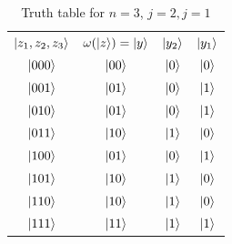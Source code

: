 \documentclass[12pt,a4paper]{article}
\begin{document}
\begin{table}[t]
    \centering
    \begin{tabular}{c|c|c|c}
        $\ket{z_1,z_2,z_3}$ & $\omega(\ket{z}) = \ket{y}$ & $\ket{y_2}$ & $\ket{y_1}$\\
        $\ket{000}$& $\ket{00}$ & $\ket{0}$ & $\ket{0}$\\
        $\ket{001}$& $\ket{01}$ & $\ket{0}$ & $\ket{1}$\\
        $\ket{010}$& $\ket{01}$ & $\ket{0}$ & $\ket{1}$\\
        $\ket{011}$& $\ket{10}$ & $\ket{1}$ & $\ket{0}$\\
        $\ket{100}$& $\ket{01}$ & $\ket{0}$ & $\ket{1}$\\
        $\ket{101}$& $\ket{10}$ & $\ket{1}$ & $\ket{0}$\\
        $\ket{110}$& $\ket{10}$ & $\ket{1}$ & $\ket{0}$\\
        $\ket{111}$& $\ket{11}$ & $\ket{1}$ & $\ket{1}$\\
        
    \end{tabular}
    \caption{Truth table for \(n=3\), \(j=2, j=1\)}
    \label{tab:ttn3j2}
\end{table}
\end{document}
